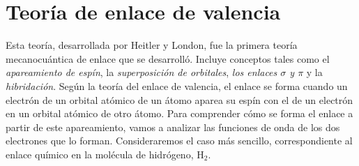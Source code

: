 %

\section{Teoría de enlace de valencia}
Esta teoría, desarrollada por Heitler y London, fue la primera
teoría mecanocuántica de enlace que se desarrolló. Incluye 
conceptos tales como el \textit{apareamiento de espín}, 
la \textit{superposición de orbitales}, 
\textit{los enlaces $\sigma$ y $\pi$} y la
\textit{hibridación}.
Según la teoría del enlace de valencia, el enlace se forma 
cuando un electrón de un orbital atómico de un átomo aparea su 
espín con el de un electrón en un orbital atómico de otro átomo.
Para comprender cómo se forma el enlace a partir de este
apareamiento, vamos a analizar las funciones de onda de los 
dos electrones que lo forman. Consideraremos el caso más
sencillo, correspondiente al enlace químico 
en la molécula de hidrógeno, H$_2$.

